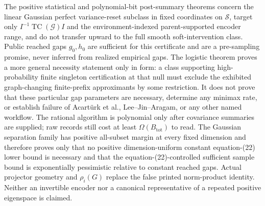 \documentclass{article}
\begin{document}
The positive statistical and polynomial-bit post-summary theorems concern the linear Gaussian perfect variance-reset subclass in fixed coordinates on \(\mathcal S\), target only \(I^{-1}\operatorname{TC}(\mathcal G)I\) and the environment-indexed parent-supported encoder range, and do not transfer upward to the full smooth soft-intervention class. Public reached gaps \(g_0,h_0\) are sufficient for this certificate and are a pre-sampling promise, never inferred from realized empirical gaps. The logistic theorem proves a more general necessity statement only in form: a class supporting high-probability finite singleton certification at that null must exclude the exhibited graph-changing finite-prefix approximants by some restriction. It does not prove that these particular gap parameters are necessary, determine any minimax rate, or establish failure of Acartürk et al., Lee--Jin--Aragam, or any other named workflow. The rational algorithm is polynomial only after covariance summaries are supplied; raw records still cost at least \(\Omega(B_{\mathrm{tot}})\) to read. The Gaussian separation family has positive all-subset margin at every fixed dimension and therefore proves only that no positive dimension-uniform constant equation-(22) lower bound is necessary and that the equation-(22)-controlled sufficient sample bound is exponentially pessimistic relative to constant reached gaps. Actual projector geometry and \(\rho_i(G)\) replace the false printed norm-product identity. Neither an invertible encoder nor a canonical representative of a repeated positive eigenspace is claimed.
\end{document}
